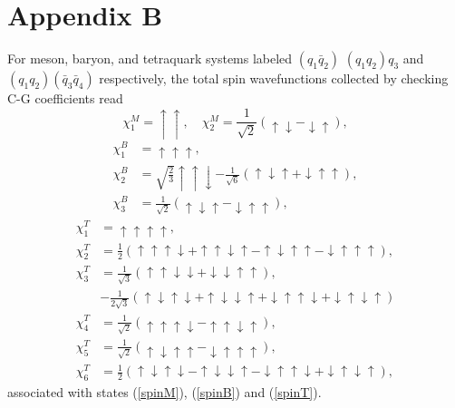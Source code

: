 \documentclass[prt,twocolumn,floatfix,nofootinbib]{revtex4}
\begin{document}
\section*{Appendix B}\label{AppendixB}
\setcounter{equation}{0}
\renewcommand{\theequation}{B\arabic{equation}}
For meson, baryon, and tetraquark systems labeled $(q_{1}\bar{q}_{2})$ $(q_{1}q_{2})q_{3}$ and $(q_{1}q_{2})(\bar{q}_{3}\bar{q}_{4})$ respectively,
the total spin wavefunctions collected by checking C-G coefficients read
\begin{equation}\label{pspinM}
    \chi_{1}^{M}=\uparrow\uparrow, \quad \chi_{2}^{M}=\frac{1}{\sqrt{2}} \left(\uparrow\downarrow-\downarrow\uparrow\right),
\end{equation}
\begin{equation}\label{pspinB}
    \begin{aligned}
        \chi_{1}^{B}&=\uparrow\uparrow\uparrow, \\
        \chi_{2}^{B}&=\sqrt{\frac{2}{3}}\uparrow\uparrow\downarrow-\frac{1}{\sqrt{6}} \left(\uparrow\downarrow\uparrow+\downarrow\uparrow\uparrow\right), \\
        \chi_{3}^{B}&=\frac{1}{\sqrt{2}} \left(\uparrow\downarrow\uparrow-\downarrow\uparrow\uparrow\right),
    \end{aligned}
\end{equation}
\begin{equation}\label{pspinT}
    \begin{aligned}
        \chi_{1}^{T}&=\uparrow\uparrow\uparrow\uparrow, \\
        \chi_{2}^{T}&=\frac{1}{2} \left(\uparrow\uparrow\uparrow\downarrow+\uparrow\uparrow\downarrow\uparrow-\uparrow\downarrow\uparrow\uparrow-\downarrow\uparrow\uparrow\uparrow\right), \\
        \chi_{3}^{T}&=\frac{1}{\sqrt{3}} \left(\uparrow\uparrow\downarrow\downarrow+\downarrow\downarrow\uparrow\uparrow\right), \\
        &-\frac{1}{2\sqrt{3}} \left(\uparrow\downarrow\uparrow\downarrow+\uparrow\downarrow\downarrow\uparrow+\downarrow\uparrow\uparrow\downarrow+\downarrow\uparrow\downarrow\uparrow\right) \\
        \chi_{4}^{T}&=\frac{1}{\sqrt{2}} \left(\uparrow\uparrow\uparrow\downarrow-\uparrow\uparrow\downarrow\uparrow\right), \\
        \chi_{5}^{T}&=\frac{1}{\sqrt{2}} \left(\uparrow\downarrow\uparrow\uparrow-\downarrow\uparrow\uparrow\uparrow\right), \\
        \chi_{6}^{T}&=\frac{1}{2} \left(\uparrow\downarrow\uparrow\downarrow-\uparrow\downarrow\downarrow\uparrow-\downarrow\uparrow\uparrow\downarrow+\downarrow\uparrow\downarrow\uparrow\right),
    \end{aligned}
\end{equation}
associated with states (\ref{spinM}), (\ref{spinB}) and (\ref{spinT}).
\end{document}

